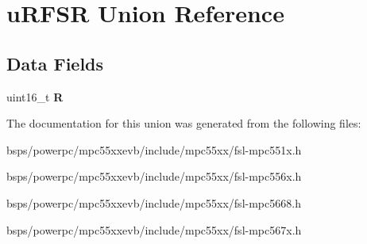\hypertarget{unionuRFSR}{}\section{u\+R\+F\+SR Union Reference}
\label{unionuRFSR}
\subsection*{Data Fields}
\begin{DoxyCompactItemize}
\item 
\mbox{\label{unionuRFSR_a3134dac2876a10815bb6f34a37426dc5}} 
uint16\+\_\+t {\bfseries R}
\end{DoxyCompactItemize}


The documentation for this union was generated from the following files\+:\begin{DoxyCompactItemize}
\item 
bsps/powerpc/mpc55xxevb/include/mpc55xx/fsl-\/mpc551x.\+h\item 
bsps/powerpc/mpc55xxevb/include/mpc55xx/fsl-\/mpc556x.\+h\item 
bsps/powerpc/mpc55xxevb/include/mpc55xx/fsl-\/mpc5668.\+h\item 
bsps/powerpc/mpc55xxevb/include/mpc55xx/fsl-\/mpc567x.\+h\end{DoxyCompactItemize}
